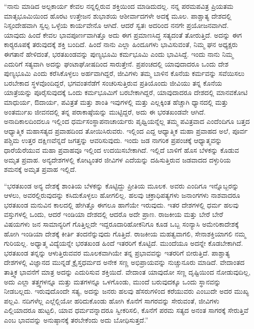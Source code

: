 “ನಾನು ಮಾಡಿದ ಅಲ್ಪಕಾರ್ಯ ಕೇವಲ ನನ್ನಲ್ಲಿರುವ ಶಕ್ತಿಯಿಂದ ಮಾಡಿದುದಲ್ಲ. ನನ್ನ ಪರಮಪವಿತ್ರ ಪ್ರಿಯತಮ ಮಾತೃಭೂಮಿಯಿಂದ ಹೊರಟ ಉತ್ತೇಜನ ಶುಭಾಶಯ ಆಶೀರ್ವಾದಗಳೇ ಅದಕ್ಕೆ ಮೂಲ. ಪಾಶ್ಚಾತ್ಯ ದೇಶದಲ್ಲಿ ನಿಸ್ಸಂದೇಹವಾಗಿ ಸ್ವಲ್ಪ ಒಳ್ಳೆಯ ಕಾರ್ಯವೇನೊ ಆಗಿದೆ. ಆದರೆ ಸ್ವತಃ ಅದರಿಂದ ನನಗೇ ಪ್ರಯೋಜನವಾಗಿದೆ. ಯಾವುದು ಹಿಂದೆ ಕೇವಲ ಭಾವಪೂರ್ಣವಾಗಿತ್ತೊ ಅದು ಈಗ ಪ್ರಮಾಣಸಿದ್ಧ ಸತ್ಯದಂತೆ ತೋರುತ್ತಿದೆ. ಅದನ್ನು ಈಗ ಕಾರ‍್ಯ‍ರೂಪಕ್ಕೆ ತರುವುದಕ್ಕೆ ಶಕ್ತಿ ಬಂದಿದೆ. ಹಿಂದೆ ನಾನು ಎಲ್ಲಾ ಹಿಂದೂಗಳು ಭಾವಿಸುವಂತೆ, ನಿಮ್ಮ ಘನ ಅಧ್ಯಕ್ಷರು ಈಗತಾನೆ ಹೇಳಿದಂತೆ, ಭರತಖಂಡವನ್ನು ಪುಣ್ಯಭೂಮಿ ಕರ್ಮಭೂಮಿ ಎಂದು ಭಾವಿಸಿದ್ದೆ. ಇಂದು ನಾನು ನಿಮ್ಮ ಎದುರಿಗೆ ಸತ್ಯವಾಗಿ ಅದನ್ನು ಘಂಟಾಘೋಷದಿಂದ ಸಾರುತ್ತೇನೆ. ಪ್ರಪಂಚದಲ್ಲಿ ಯಾವುದಾದರೂ ಒಂದು ದೇಶ ಪುಣ್ಯಭೂಮಿ ಎಂದು ಕರೆಸಿಕೊಳ್ಳಲು ಅರ್ಹವಾಗಿದ್ದರೆ, ಜೀವಿಗಳು ತಮ್ಮ ಬಾಳಿನ ಕೊನೆಯ ಕರ್ಮವನ್ನು ಸವೆಯಿಸಲು ಬರಬೇಕಾದ ಸ್ಥಳವೊಂದಿದ್ದರೆ, ಭಗವಂತನೆಡೆಗೆ ಸಂಚರಿಸುತ್ತಿರುವ ಪ್ರತಿಯೊಂದು ಜೀವಿಯು ತನ್ನ ಕೊನೆಯ ಯಾತ್ರೆಯನ್ನು ಪೂರೈಸುವುದಕ್ಕೆ ಒಂದು ಕರ್ಮಭೂಮಿಗೆ ಬರಬೇಕಾಗಿದ್ದರೆ, ಯಾವುದಾದರೂ ದೇಶದಲ್ಲಿ ಮಾನವಕೋಟಿ ಮಾಧುರ್ಯ, ಔದಾರ್ಯ, ಪವಿತ್ರತೆ ಮತ್ತು ಶಾಂತಿ ಇವುಗಳಲ್ಲಿ ಮತ್ತು ಎಲ್ಲಕ್ಕಿಂತ ಹೆಚ್ಚಾಗಿ ಧ್ಯಾನದಲ್ಲಿ ಮತ್ತು ಅಂತರ್ಮುಖ ಜೀವನದಲ್ಲಿ ತನ್ನ ಪರಾಕಾಷ್ಠೆಯನ್ನು ಮುಟ್ಟಿದ್ದರೆ, ಅದು ಈ ಭರತಖಂಡವೇ ಆಗಿದೆ. ಅನಾದಿಕಾಲದಿಂದಲೂ ಇಲ್ಲಿಂದ ಧರ್ಮಸಂಸ್ಥಾಪನಾಚಾರ್ಯರು ಪೃಥ್ವಿಯನ್ನೆಲ್ಲ ತಮ್ಮ ಪವಿತ್ರವಾದ ಎಂದೆಂದಿಗೂ ಬತ್ತದ ಆಧ್ಯಾತ್ಮಿಕ ಮಹಾಸತ್ಯದ ಪ್ರವಾಹದಿಂದ ತೋಯಿಸಿರುವರು. ಇಲ್ಲಿಂದ ಎದ್ದ ಆಧ್ಯಾತ್ಮಿಕ ಮಹಾ ಪ್ರವಾಹದ ಅಲೆ, ಪೂರ್ವ ಪಶ್ಚಿಮ ಉತ್ತರ ದಕ್ಷಿಣವೆನ್ನದೆ ಜಗತ್ತನ್ನು ಆವರಿಸುವುದು. ಇಂದು ಜಡ ನಾಗರಿಕ ಪ್ರಪಂಚಕ್ಕೆ ಆಧ್ಯಾತ್ಮವನ್ನು ಧಾರೆಯೆರೆಯುವ ಮಹಾ ಪ್ರವಾಹವೂ ಇಲ್ಲಿಂದ ಉದಯಿಸಬೇಕಾಗಿದೆ. ಇಲ್ಲಿದೆ ಬಾಳಿಗೆ ಹೊಸ ಬೆಳಕನ್ನು ಕೊಡುವ ಅಮೃತ ಪ್ರವಾಹ. ಅನ್ಯದೇಶಗಳಲ್ಲಿ ಕೋಟ್ಯಂತರ ಜೀವಿಗಳ ಎದೆಯನ್ನು ದಹಿಸುತ್ತಿರುವ ಜಡವಾದದ ದಳ್ಳುರಿಯ ಶಮನಕ್ಕೆ ಅಮೃತ ಪ್ರವಾಹ ಇಲ್ಲಿದೆ.

\vskip 3pt

 “ಭರತಖಂಡ ಅನ್ಯ ದೇಶಕ್ಕೆ ಶಾಂತಿಯ ಬೆಳಕನ್ನು ಕೊಟ್ಟಿದ್ದು ಪ್ರೀತಿಯ ಮೂಲಕ. ಅವರು ಎಂದಿಗೂ ಇನ್ನೊಬ್ಬರನ್ನು ಆಳಲು, ಅವರಲ್ಲಿರುವುದನ್ನು ಕಸಿದುಕೊಳ್ಳಲು ಹೋಗಲಿಲ್ಲ. ಹಲವು ಚಕ್ರಾಧಿಪತ್ಯಗಳು ಜನಾಂಗಗಳು ನಾಶವಾದರೂ ಭರತಖಂಡ ಮನುವಿನ ಕಾಲದಲ್ಲಿ ಹೇಗಿತ್ತೊ ಈಗಲೂ ಹಾಗೆಯೇ ಇರುವುದು. ಇತರ ದೇಶಗಳಲ್ಲಿ ಧರ್ಮ ಹಲವು ವಸ್ತುಗಳಲ್ಲಿ ಒಂದು, ಆದರೆ ಇಂಡಿಯಾ ದೇಶದಲ್ಲಿ ಆದರೊ ಅದೇ ಪ್ರಾಣ. ರಾಜಕೀಯ ಮತ್ತು ಬೇರೆ ಬೇರೆ ವಿಷಯಗಳು ಜನ ಸಾಮಾನ್ಯರಿಗೆ ಗೊತ್ತಿಲ್ಲದೇ ಇದ್ದರೂ\break ದಾರಿಹೋಕನಿಗೂ ಕೂಡ ಒಬ್ಬ ಸಂನ್ಯಾಸಿ ಅಮೇರಿಕಾದೇಶಕ್ಕೆ ಹೋಗಿ ಇಂಡಿಯಾ ದೇಶಕ್ಕೆ ಕೀರ್ತಿ ತಂದನೆನ್ನುವುದು ಗೊತ್ತಿದೆ. ರಾಜಕೀಯ ಮಹತ್ವವಾಗಲಿ, ಸೇನಾಶಕ್ತಿಯಾಗಲಿ ನಮ್ಮ ಗುರಿಯಲ್ಲ. ಅಧ್ಯಾತ್ಮ ವಿದ್ಯೆಯನ್ನೇ ಭರತಖಂಡ ಹಿಂದೆ ಇತರರಿಗೆ ಕೊಟ್ಟಿದೆ. ಮುಂದೆಯೂ ಅದನ್ನೇ ಕೊಡಬೇಕಾಗಿದೆ. ಭರತಖಂಡ ತನ್ನನ್ನು ಆಳುತ್ತಿರುವವರ ಮೂಲಕವಾಗಿಯೇ ತನ್ನ ಪ್ರಭಾವವನ್ನು ಇತರರಿಗೆ ಬೀರುತ್ತಿದೆ. ಪಾಶ್ಚಾತ್ಯ ದೇಶಗಳಲ್ಲಿ ವಿಜ್ಞಾನದ ಮುನ್ನಡೆ ಕ್ರೈಸ್ತಧರ್ಮದ ಅನೇಕ ಸಣ್ಣ ಅಭಿಪ್ರಾಯವನ್ನು ನುಚ್ಚುನೂರು ಮಾಡಿದೆ. ವೇದಾಂತದ ತಾತ್ತ್ವಿಕ ಭಾವನೆಗೆ ಮಾತ್ರ ಅದನ್ನು ಎದುರಿಸುವ ಶಕ್ತಿಯಿದೆ. ವೇದಾಂತ ಯಾವುದೋ ಸಣ್ಣ ದೃಷ್ಟಿಯಿಂದ ನೋಡುವುದಿಲ್ಲ, ಅದು ಎಲ್ಲಾ ತತ್ತ್ವಗಳನ್ನೂ ಮತ್ತು ಮತಗಳನ್ನೂ ಒಳಗೊಂಡು, ಮುಂದೆ ಬರುವುದಕ್ಕೂ ಒಂದು ಸ್ಥಾನವನ್ನು ನೀಡಬಲ್ಲದು. ಇರುವುದೊಂದೇ ಸತ್ಯ, ಅದನ್ನು ಜನರು ಹಲವು ಹೆಸರುಗಳಿಂದ ಕರೆಯುವರು ಎಂಬುದೇ ಅದರ ಮುಖ್ಯ ಪಲ್ಲವಿ. ನದಿಗಳೆಲ್ಲ ಎಲ್ಲೆಲ್ಲಿಯೋ ಹರಿದುಕೊಂಡು ಹೋಗಿ ಕೊನೆಗೆ ಸಾಗರವನ್ನು ಸೇರುವಂತೆ, ಜೀವಿಗಳು ಎಲ್ಲಿಯಾದರೂ ಹುಟ್ಟಲಿ, ಯಾವ ಧರ್ಮವನ್ನಾದರೂ ಸ್ವೀಕರಿಸಲಿ, ಕೊನೆಗೆ ಪರಮ ಸತ್ಯದ ಅನಂತ ಸಾಗರಕ್ಕೆ ಸೇರುತ್ತಿವೆ ಎಂಬ ಭಾವವನ್ನು ಅನುಷ್ಠಾನಕ್ಕೆ ತರಬೇಕೆಂದು ಅದು ಬೋಧಿಸುತ್ತದೆ.” 

